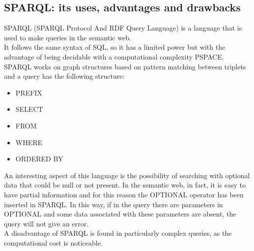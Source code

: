 \newpage

\subsection{SPARQL: its uses, advantages and drawbacks}
SPARQL (SPARQL Protocol And RDF Query Language) is a language that
is used to make queries in the semantic web.\\
It follows the same syntax of SQL, so it has a limited power but with
the advantage of being decidable with a computational complexity PSPACE.\\
SPARQL works on graph structures based on pattern matching between
triplets and a query has the following structure:
\begin{itemize}
    \item PREFIX
    \item SELECT
    \item FROM
    \item WHERE
    \item ORDERED BY
\end{itemize}
An interesting aspect of this language is the possibility of searching
with optional data that could be null or not present.
In the semantic web, in fact, it is easy to have partial information
and for this reason the OPTIONAL operator has been inserted in SPARQL.
In this way, if in the query there are parameters in OPTIONAL and some
data associated with these parameters are
absent, the query will not give an error.\\
A disadvantage of SPARQL is found in particularly complex queries,
as the computational cost is noticeable.

